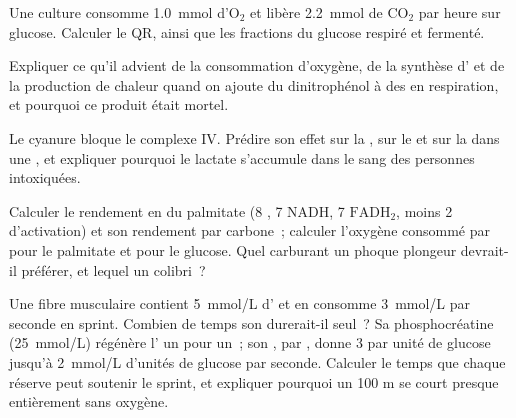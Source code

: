 \begin{exercise}[$\star\star$]\label{exo:b1:respiration-fermentation:7}
Une culture consomme \qty{1.0}{mmol} d'$\mathrm{O_2}$ et libère
\qty{2.2}{mmol} de $\mathrm{CO_2}$ par heure sur glucose. Calculer le
QR, ainsi que les fractions du glucose respiré et fermenté.
\end{exercise}

\begin{exercise}[$\star\star$]\label{exo:b1:respiration-fermentation:8}
Expliquer ce qu'il advient de la consommation d'oxygène, de la synthèse
d' et de la production de chaleur quand on ajoute du dinitrophénol à
des  en respiration, et pourquoi ce produit était mortel.
\end{exercise}

\begin{exercise}[$\star\star$]\label{exo:b1:respiration-fermentation:9}
Le cyanure bloque le complexe IV. Prédire son effet sur la , sur le  et sur la  dans une
, et expliquer pourquoi le lactate s'accumule dans le sang des
personnes intoxiquées.
\end{exercise}

\begin{exercise}[$\star\star\star$]\label{exo:b1:respiration-fermentation:10}
Calculer le rendement en  du palmitate (8 , 7 NADH, 7
$\mathrm{FADH_2}$, moins 2  d'activation) et son rendement par
carbone~; calculer l'oxygène consommé par  pour le palmitate et pour
le glucose. Quel carburant un phoque plongeur devrait-il préférer, et
lequel un colibri~?
\end{exercise}

\begin{exercise}[$\star\star\star$]\label{exo:b1:respiration-fermentation:11}
Une fibre musculaire contient \qty{5}{mmol/L} d' et en consomme
\qty{3}{mmol/L} par seconde en sprint. Combien de temps son 
durerait-il seul~? Sa phosphocréatine (\qty{25}{mmol/L}) régénère l'
un pour un~; son , par , donne 3  par unité de
glucose jusqu'à \qty{2}{mmol/L} d'unités de glucose par seconde.
Calculer le temps que chaque réserve peut soutenir le sprint, et
expliquer pourquoi un 100 m se court presque entièrement sans oxygène.
\end{exercise}

